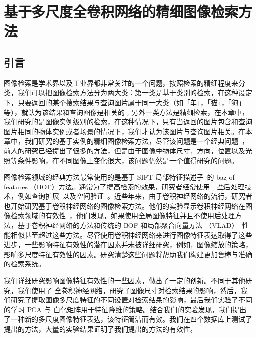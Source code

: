
\chapter{基于多尺度全卷积网络的精细图像检索方法}\label{chapter:mfc}
\section{引言}
图像检索是学术界以及工业界都非常关注的一个问题，按照检索的精细程度来分类，我们可以把图像检索方法分为两大类：第一类是基于类别的检索，在这种设定下，只要返回的某个搜索结果与查询图片属于同一大类（如「车」，「猫」，「狗」等），就认为该结果和查询图像是相关的；另外一类方法是精细检索，在本章中，我们研究的是图像实例级别的检索，在这种情况下，只有当返回的图片包含和查询图片相同的物体实例或者场景的情况下，我们才认为该图片与查询图片相关。在本章中，我们研究的基于实例的精细图像检索方法，尽管该问题是一个经典问题~\cite{Sivic2003VideoGA,Nistr2006ScalableRW,Philbin2007ObjectRW,Razavian2014CNNFO,Babenko2014NeuralCF,Tolias2015ParticularOR,Babenko2015AggregatingLD}，前人的研究已经提出了很多的方法，但是由于图像中物体尺寸，方向，位置以及光照等条件影响，在不同图像上变化很大，该问题仍然是一个值得研究的问题。

图像检索领域的经典方法最常使用的是基于 SIFT 局部特征描述子~\cite{Lowe2004DistinctiveIF}的 bag of features （BOF）方法。通常为了提高检索的效果，研究者经常使用一些后处理技术，例如查询扩展~\cite{Chum2007TotalRA}以及空间验证~\cite{Philbin2007ObjectRW}。近些年来，由于卷积神经网络的流行，研究者也开始研究基于卷积神经网络的图像检索方法。他们的实验显示卷积神经网络在图像检索领域的有效性~\cite{Babenko2014NeuralCF,Razavian2014CNNFO,Tolias2015ParticularOR}，他们发现，如果使用全局图像特征并且不使用后处理方法，基于卷积神经网络的方法和传统的 BOF 和局部聚合向量方法 （VLAD）~\cite{Jgou2010AggregatingLD}性能相似甚至超过这些方法。尽管使用卷积神经网络来进行图像特征表达取得了这些进步，一些影响特征有效性的潜在因素并未被详细研究，例如，图像缩放的策略，影响多尺度特征有效性的因素。研究清楚这些问题将帮助我们构建更加鲁棒与准确的检索系统。

我们详细研究影响图像特征有效性的一些因素，做出了一定的创新。不同于其他研究，我们使用了
全卷积神经网络，研究了图像尺寸对检索结果的影响，然后，我们研究了提取图像多尺度特征的不同设置对检索结果的影响，最后我们实验了不同的学习 PCA 与 白化矩阵用于特征降维的策略。结合我们的实验发现，我们提出了一种新的多尺度图像特征表达，该特征简洁而有效。我们在四个数据库上测试了提出的方法，大量的实验结果证明了我们提出的方法的有效性。

